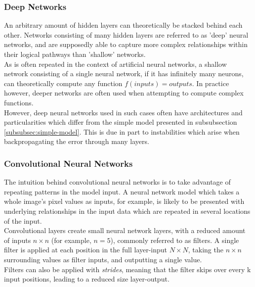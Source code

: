 \subsubsection{Deep Networks}

An arbitrary amount of hidden layers can theoretically be stacked behind each other. Networks consisting of many hidden layers are referred to as 'deep' neural networks, and are supposedly able to capture more complex relationships within their logical pathways than 'shallow' networks.\\

As is often repeated in the context of artificial neural networks, a shallow network consisting of a single neural network, if it has infinitely many neurons, can theoretically compute any function $f(inputs) = outputs$. In practice however, deeper networks are often used when attempting to compute complex functions.\\

However, deep neural networks used in such cases often have architectures and particularities which differ from the simple model presented in subsubsection \ref{subsubsec:simple-model}. This is due in part to instabilities which arise when backpropagating the error through many layers.\\ 

\subsubsection{Convolutional Neural Networks}

The intuition behind convolutional neural networks is to take advantage of repeating patterns in the model input. A neural network model which takes a whole image's pixel values as inputs, for example, is likely to be presented with underlying relationships in the input data which are repeated in several locations of the input.\\

Convolutional layers create small neural network layers, with a reduced amount of inputs $n\times n$ (for example, $n = 5$), commonly referred to as filters. A single filter is applied at each position in the full layer-input $N\times N$, taking the $n\times n$ surrounding values as filter inputs, and outputting a single value.\\

Filters can also be applied with \textit{strides}, meaning that the filter skips over every k input positions, leading to a reduced size layer-output.\\

